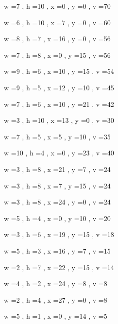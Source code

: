 \documentclass[11pt]{article}
\begin{document}
w =7 , h =10 , x =0 , y =0 , v =70
\par
w =6 , h =10 , x =7 , y =0 , v =60
\par
w =8 , h =7 , x =16 , y =0 , v =56
\par
w =7 , h =8 , x =0 , y =15 , v =56
\par
w =9 , h =6 , x =10 , y =15 , v =54
\par
w =9 , h =5 , x =12 , y =10 , v =45
\par
w =7 , h =6 , x =10 , y =21 , v =42
\par
w =3 , h =10 , x =13 , y =0 , v =30
\par
w =7 , h =5 , x =5 , y =10 , v =35
\par
w =10 , h =4 , x =0 , y =23 , v =40
\par
w =3 , h =8 , x =21 , y =7 , v =24
\par
w =3 , h =8 , x =7 , y =15 , v =24
\par
w =3 , h =8 , x =24 , y =0 , v =24
\par
w =5 , h =4 , x =0 , y =10 , v =20
\par
w =3 , h =6 , x =19 , y =15 , v =18
\par
w =5 , h =3 , x =16 , y =7 , v =15
\par
w =2 , h =7 , x =22 , y =15 , v =14
\par
w =4 , h =2 , x =24 , y =8 , v =8
\par
w =2 , h =4 , x =27 , y =0 , v =8
\par
w =5 , h =1 , x =0 , y =14 , v =5
\par
\newpage
\end{document}
